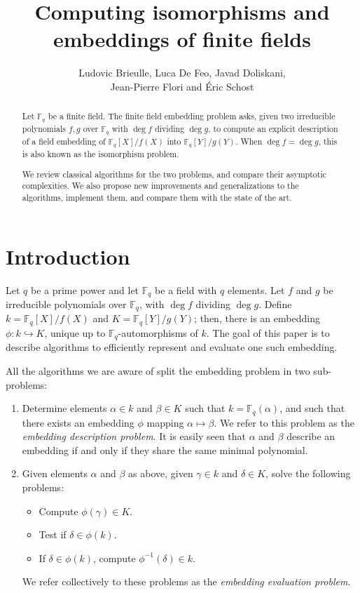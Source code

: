\documentclass[12pt]{article}
\title{Computing isomorphisms and embeddings of finite fields}
\author{Ludovic Brieulle, Luca De Feo, Javad Doliskani,\\ Jean-Pierre
  Flori and \'Eric Schost}
\theoremstyle{plain}
\theoremstyle{definition}
\def\F{\ensuremath{\mathbb{F}}}
\newcounter{algorithm}
\begin{document}
\maketitle
\begin{abstract}
  Let $\F_q$ be a finite field.  The finite field embedding problem
  asks, given two irreducible polynomials $f,g$ over $\F_q$ with $\deg
  f$ dividing $\deg g$, to compute an explicit description of a field
  embedding of $\F_q[X]/f(X)$ into $\F_q[Y]/g(Y)$. When $\deg f = \deg
  g$, this is also known as the isomorphism problem.
  
  We review classical algorithms for the two problems, and compare
  their asymptotic complexities. We also propose new improvements and
  generalizations to the algorithms, implement them, and compare them
  with the state of the art.
\end{abstract}

\setcounter{tocdepth}{2}
\tableofcontents



\section{Introduction}
\label{sec:introduction}

Let $q$ be a prime power and let $\F_q$ be a field with $q$
elements. Let $f$ and $g$ be irreducible polynomials over $\F_q$, with
$\deg f$ dividing $\deg g$. Define $k=\F_q[X]/f(X)$ and
$K=\F_q[Y]/g(Y)$; then, there is an embedding $\phi:k\hookrightarrow
K$, unique up to $\F_q$-automorphisms of $k$. The goal of this paper
is to describe algorithms to efficiently represent and evaluate one
such embedding.

All the algorithms we are aware of split the embedding problem in two
sub-problems:
\begin{enumerate}
\item Determine elements $\alpha\in k$ and $\beta\in K$ such that
  $k=\F_q(\alpha)$, and such that there exists an
  embedding $\phi$ mapping $\alpha\mapsto\beta$. We refer to this
  problem as the \emph{embedding description problem}.
  It is easily seen that $\alpha$ and $\beta$ describe an embedding
  if and only if they share the same minimal polynomial.
\item Given elements $\alpha$ and $\beta$ as above, given $\gamma\in
  k$ and $\delta\in K$, solve the following problems:
  \begin{itemize}
  \item Compute $\phi(\gamma)\in K$.
  \item Test if $\delta\in\phi(k)$.
  \item If $\delta\in\phi(k)$, compute $\phi^{-1}(\delta)\in k$.
  \end{itemize}
  We refer collectively to these problems as the \emph{embedding
    evaluation problem}.
\end{enumerate}
\end{document}
